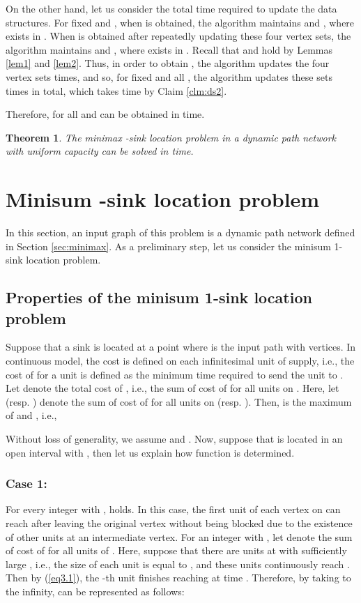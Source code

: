 \documentclass[a4paper]{llncs}
\newtheorem{thm}{Theorem}
\begin{document}
On the other hand, let us consider the total time required to update the data structures.
For fixed  and , when  is obtained, the algorithm maintains  and ,
where  exists in .
When  is obtained after repeatedly updating these four vertex sets, 
the algorithm maintains  and ,
where  exists in .
Recall that  and  hold by Lemmas \ref{lem1} and \ref{lem2}.
Thus, in order to obtain , the algorithm updates the four vertex sets  times,
and so, for fixed  and all , the algorithm updates these sets  times in total,
which takes  time by Claim \ref{clm:ds2}.


Therefore,  for all  and  can be obtained in  time.
\begin{thm}
The minimax -sink location problem in a dynamic path network with uniform capacity can be solved in  time.
\label{thm:mm1}
\end{thm}














\section{Minisum -sink location problem}
\label{sec:minisum}
In this section, an input graph of this problem is a dynamic path network defined in Section \ref{sec:minimax}.
As a preliminary step, let us consider the minisum 1-sink location problem.



\subsection{Properties of the minisum 1-sink location problem}
\label{sec:minisum1}
Suppose that a sink is located at a point  where  is the input path with  vertices.
In continuous model, the cost is defined on each infinitesimal unit of supply,
i.e., the cost of  for a unit is defined as the minimum time required to send the unit to .
Let  denote the total cost of , i.e., the sum of cost of  for all units on .
Here, let  (resp. ) denote the sum of cost of  for all units on  (resp. ).
Then,  is the maximum of  and , i.e., 

Without loss of generality, we assume  and .
Now, suppose that  is located in an open interval  with ,
then let us explain how function  is determined.

\subsubsection{Case 1:}
For every integer  with ,  holds.
In this case, the first unit of each vertex on  can reach  after leaving the original vertex 
without being blocked due to the existence of other units at an intermediate vertex. 
For an integer  with , let  denote the sum of cost of  for all units of .
Here, suppose that there are  units at  with sufficiently large , i.e., the size of each unit is equal to ,
and these units continuously reach .
Then by (\ref{eq3.1}), the -th unit finishes reaching  at time .
Therefore, by taking  to the infinity,  can be represented as follows:
\end{document}
